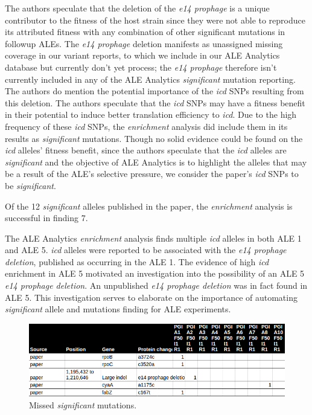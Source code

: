 \documentclass[12pt,final,masters,chapterheads]{ucsd}  %
\begin{document}
The authors speculate that the deletion of the \textit{e14 prophage} is a unique contributor to the fitness of the host strain since they were not able to reproduce its attributed fitness with any combination of other significant mutations in followup ALEs. The \textit{e14 prophage} deletion manifests as unassigned missing coverage in our variant reports, to which we include in our ALE Analytics database but currently don't yet process; the \textit{e14 prophage} therefore isn't currently included in any of the ALE Analytics \textit{significant} mutation reporting. The authors do mention the potential importance of the \textit{icd} SNPs resulting from this deletion. The authors speculate that the \textit{icd} SNPs may have a fitness benefit in their potential to induce better translation efficiency to \textit{icd}. Due to the high frequency of these \textit{icd} SNPs, the \textit{enrichment} analysis did include them in its results as \textit{significant} mutations. Though no solid evidence could be found on the \textit{icd} alleles' fitness benefit, since the authors speculate that the \textit{icd} alleles are \textit{significant} and the objective of ALE Analytics is to highlight the alleles that may be a result of the ALE's selective pressure, we consider the paper's \textit{icd} SNPs to be \textit{significant}.

Of the 12 \textit{significant} alleles published in the paper, the \textit{enrichment} analysis is successful in finding 7.

The ALE Analytics \textit{enrichment} analysis finds multiple \textit{icd} alleles in both ALE 1 and ALE 5. \textit{icd} alleles were reported to be associated with the \textit{e14 prophage deletion}, published as occurring in the ALE 1. The evidence of high \textit{icd} enrichment in ALE 5 motivated an investigation into the possibility of an ALE 5 \textit{e14 prophage deletion}. An unpublished \textit{e14 prophage deletion} was in fact found in ALE 5. This investigation serves to elaborate on the importance of automating \textit{significant} allele and mutations finding for ALE experiments.

\begin{figure}[h!]
  \caption{Missed \textit{significant} mutations.}
  \centering
  \includegraphics[width=\textwidth]{pgi_missing_significant_mutations.png}
\end{figure}
\end{document}

